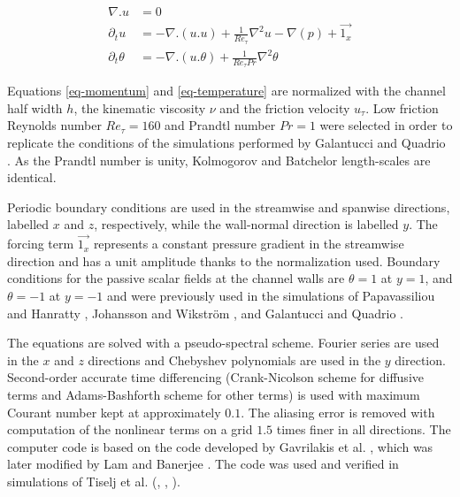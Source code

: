 \documentclass[review]{elsarticle}
\newcommand{\gqcite}{Galantucci and Quadrio \cite{galantucci2010very}}
\begin{document}
\begin{align}
\nabla . u & = 0 \label{eq-continuity} \\
\partial_t u & = - \nabla . \left( u . u \right) + \frac{1}{Re_\tau} \nabla^2 u - \nabla \left( p \right) + \overrightarrow{1_x} \label{eq-momentum} \\
\partial_t \theta & = - \nabla . \left( u . \theta \right) + \frac{1}{Re_\tau Pr} \nabla^2 \theta \label{eq-temperature}
\end{align}

Equations \eqref{eq-momentum} and \eqref{eq-temperature} are normalized with the channel half width $h$, the kinematic viscosity $\nu$ and the friction velocity $u_\tau$. Low friction Reynolds number $Re_\tau=160$ and Prandtl number $Pr=1$ were selected in order to replicate the conditions of the simulations performed by \gqcite. As the Prandtl number is unity, Kolmogorov and Batchelor length-scales are identical.

Periodic boundary conditions are used in the streamwise and spanwise directions, labelled $x$ and $z$, respectively, while the wall-normal direction is labelled $y$. The forcing term $\overrightarrow{1_x}$ {\color{red}represents a constant pressure gradient} in the streamwise direction {\color{red} and has a unit amplitude thanks to the normalization used}. Boundary conditions for the passive scalar fields at the channel walls are $\theta=1$ at $y=1$, and $\theta=-1$ at $y=-1$ and were previously used in the simulations of Papavassiliou and Hanratty \cite{papavassiliou1997transport}, Johansson and Wikstr{\"o}m \cite{johansson2000dns}, and \gqcite.

The equations are solved with a pseudo-spectral scheme. Fourier series are used in the $x$ and $z$ directions and Chebyshev polynomials are used in the $y$ direction. Second-order accurate time differencing (Crank-Nicolson scheme for diffusive terms and Adams-Bashforth scheme for other terms) is used with maximum Courant number kept at approximately $0.1$. The aliasing error is removed with computation of the nonlinear terms on a grid $1.5$ times finer in all directions. The computer code is based on the code developed by Gavrilakis et al. \cite{gavrilakis1986direct}, which was later modified by Lam and Banerjee \cite{lam1988investigation}. The code was used and verified in simulations of Tiselj et al. (\cite{tiselj2001effect}, \cite{tiselj2012dns}, \cite{tiselj2014tracking}).
\end{document}
